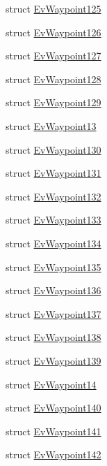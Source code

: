 \begin{DoxyCompactItemize}
\item 
struct \hyperlink{structmove__base__z__client_1_1EvWaypoint125}{Ev\+Waypoint125}
\item 
struct \hyperlink{structmove__base__z__client_1_1EvWaypoint126}{Ev\+Waypoint126}
\item 
struct \hyperlink{structmove__base__z__client_1_1EvWaypoint127}{Ev\+Waypoint127}
\item 
struct \hyperlink{structmove__base__z__client_1_1EvWaypoint128}{Ev\+Waypoint128}
\item 
struct \hyperlink{structmove__base__z__client_1_1EvWaypoint129}{Ev\+Waypoint129}
\item 
struct \hyperlink{structmove__base__z__client_1_1EvWaypoint13}{Ev\+Waypoint13}
\item 
struct \hyperlink{structmove__base__z__client_1_1EvWaypoint130}{Ev\+Waypoint130}
\item 
struct \hyperlink{structmove__base__z__client_1_1EvWaypoint131}{Ev\+Waypoint131}
\item 
struct \hyperlink{structmove__base__z__client_1_1EvWaypoint132}{Ev\+Waypoint132}
\item 
struct \hyperlink{structmove__base__z__client_1_1EvWaypoint133}{Ev\+Waypoint133}
\item 
struct \hyperlink{structmove__base__z__client_1_1EvWaypoint134}{Ev\+Waypoint134}
\item 
struct \hyperlink{structmove__base__z__client_1_1EvWaypoint135}{Ev\+Waypoint135}
\item 
struct \hyperlink{structmove__base__z__client_1_1EvWaypoint136}{Ev\+Waypoint136}
\item 
struct \hyperlink{structmove__base__z__client_1_1EvWaypoint137}{Ev\+Waypoint137}
\item 
struct \hyperlink{structmove__base__z__client_1_1EvWaypoint138}{Ev\+Waypoint138}
\item 
struct \hyperlink{structmove__base__z__client_1_1EvWaypoint139}{Ev\+Waypoint139}
\item 
struct \hyperlink{structmove__base__z__client_1_1EvWaypoint14}{Ev\+Waypoint14}
\item 
struct \hyperlink{structmove__base__z__client_1_1EvWaypoint140}{Ev\+Waypoint140}
\item 
struct \hyperlink{structmove__base__z__client_1_1EvWaypoint141}{Ev\+Waypoint141}
\item 
struct \hyperlink{structmove__base__z__client_1_1EvWaypoint142}{Ev\+Waypoint142}
\item 

\end{DoxyCompactItemize}
